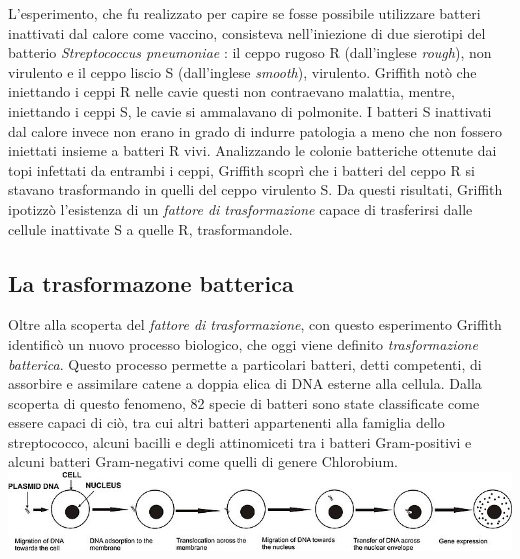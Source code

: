 \documentclass[11pt]{report}
\begin{document}
	 L'esperimento, che fu realizzato per capire se fosse possibile utilizzare batteri inattivati dal calore come vaccino, consisteva nell'iniezione di due sierotipi del batterio \textit{Streptococcus pneumoniae} :
	 il ceppo rugoso R (dall'inglese \textit{rough}), non virulento e il ceppo liscio S (dall'inglese \textit{smooth}), virulento.
	 Griffith notò che iniettando i ceppi R nelle cavie questi non contraevano malattia, mentre, iniettando i ceppi S, le cavie si ammalavano di polmonite.
	 I batteri S inattivati dal calore invece non erano in grado di indurre patologia a meno che non fossero iniettati insieme a batteri R vivi. Analizzando le colonie batteriche ottenute dai topi infettati da entrambi i ceppi, Griffith scoprì che i batteri del ceppo R si stavano trasformando in quelli del ceppo virulento S. Da questi risultati, Griffith ipotizzò l'esistenza di un \textit{fattore di trasformazione} capace di trasferirsi dalle cellule inattivate S a quelle R, trasformandole.\cite{griffith1928significance}
	 
	 \subsection{La trasformazone batterica}
	 
	 Oltre alla scoperta del \textit{fattore di trasformazione}, con questo esperimento Griffith identificò un nuovo processo biologico, che oggi viene definito \textit{trasformazione batterica}. Questo processo permette a particolari batteri, detti competenti, di assorbire e assimilare catene a doppia elica di DNA esterne alla cellula. Dalla scoperta di questo fenomeno, 82 specie di batteri sono state classificate come essere capaci di ciò, tra cui altri batteri appartenenti alla famiglia dello streptococco, alcuni bacilli e degli attinomiceti tra i batteri Gram-positivi e alcuni batteri Gram-negativi come quelli di genere Chlorobium.\cite{johnston2014bacterial}\\
	 
	 \includegraphics[width=\textwidth]{elettroporazione.jpg}\\
	 
\end{document}
